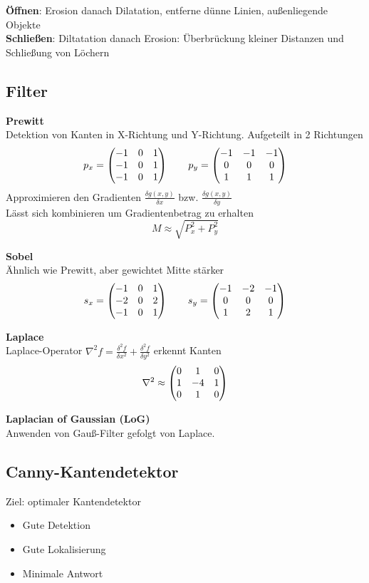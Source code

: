 \textbf{Öffnen}: Erosion danach Dilatation, entferne dünne Linien, außenliegende Objekte\\
\textbf{Schließen}: Diltatation danach Erosion: Überbrückung kleiner Distanzen und Schließung von Löchern\\

\subsection{Filter}%
\label{bv:sub:filter}
\textbf{Prewitt}\\
Detektion von Kanten in X-Richtung und Y-Richtung. Aufgeteilt in 2 Richtungen
\[p_x = \begin{pmatrix}-1 & 0 & 1\\-1 & 0 & 1\\ -1 & 0 & 1\\\end{pmatrix} \qquad p_y = \begin{pmatrix}-1 & -1 & -1\\ 0 & 0 & 0\\ 1& 1 & 1\\\end{pmatrix}\]
Approximieren den Gradienten \(\frac{\delta g(x, y)}{\delta x}\) bzw. \(\frac{\delta g(x, y)}{\delta y}\)\\
Lässt sich kombinieren um Gradientenbetrag zu erhalten
\[M \approx \sqrt{P_x^2 + P_y^2}\]

\textbf{Sobel}\\
Ähnlich wie Prewitt, aber gewichtet Mitte stärker
\[s_x = \begin{pmatrix}-1 & 0 & 1\\-2 & 0 & 2\\ -1 & 0 & 1\\\end{pmatrix} \qquad s_y = \begin{pmatrix}-1 & -2 & -1\\ 0 & 0 & 0\\ 1& 2 & 1\\\end{pmatrix}\]

\textbf{Laplace}\\
Laplace-Operator \(\nabla^2 f= \frac{\delta^2 f}{\delta x^2}+ \frac{\delta^2 f}{\delta y^2}\) erkennt Kanten\\
\[\nabla^2 \approx \begin{pmatrix}0 & 1 & 0 \\ 1 & -4 & 1 \\ 0 & 1 & 0\end{pmatrix}\]

\textbf{Laplacian of Gaussian (LoG)}\\
Anwenden von Gauß-Filter gefolgt von Laplace.

\subsection{Canny-Kantendetektor}%
\label{bv:sub:canny-kantendetektor}
Ziel: optimaler Kantendetektor
\begin{itemize}
\item Gute Detektion
\item Gute Lokalisierung
\item Minimale Antwort
\end{itemize}

